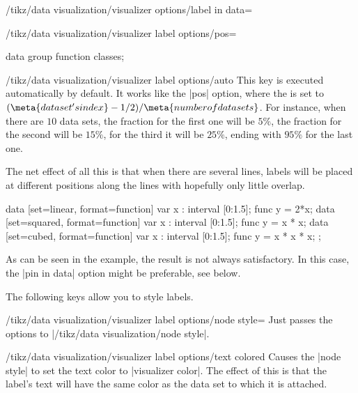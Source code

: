 \begin{key}{/tikz/data visualization/visualizer options/label in data=}
\begin{key}{/tikz/data visualization/visualizer label options/pos=}
\begin{codeexample}[width=6.3cm]
\tikz \datavisualization [
  school book axes,
  x axis={label=$x$},
  visualize as smooth line=exp,
  exp=    {label in data={text=$.2$, pos=0.2},
           label in data={text=$.5$, pos=0.5},
           label in data={text=$.95$, pos=0.95},
           style={mark=x}},
  style sheet=vary hue]
data group {function classes};
\end{codeexample}
    \end{key}
    \begin{key}{/tikz/data visualization/visualizer label options/auto}
        This key is executed automatically by default. It works like the |pos|
        option, where the  is set to $(\meta{data set's
        index}-1/2)/\meta{number of data sets}$. For instance, when there are
        $10$ data sets, the fraction for the first one will be $5\%$, the
        fraction for the second will be $15\%$, for the third it will be
        $25\%$, ending with $95\%$ for the last one.

        The net effect of all this is that when there are several lines, labels
        will be placed at different positions along the lines with hopefully
        only little overlap.
\begin{codeexample}[width=6.3cm]
\tikz \datavisualization [
  scientific axes=clean,
  visualize as smooth line/.list={linear, squared, cubed},
  linear ={label in data={text=$2x$}},
  squared={label in data={text=$x^2$}},
  cubed  ={label in data={text=$x^3$}}]
data [set=linear, format=function] {
  var x : interval [0:1.5];
  func y = 2*\value x;
}
data [set=squared, format=function] {
  var x : interval [0:1.5];
  func y = \value x * \value x;
}
data [set=cubed, format=function] {
  var x : interval [0:1.5];
  func y = \value x * \value x * \value x;
};
\end{codeexample}
        As can be seen in the example, the result is not always satisfactory.
        In this case, the |pin in data| option might be preferable, see below.
    \end{key}

    The following keys allow you to style labels.

    \begin{key}{/tikz/data visualization/visualizer label options/node style=}
        Just passes the options to |/tikz/data visualization/node style|.
    \end{key}
    \begin{key}{/tikz/data visualization/visualizer label options/text colored}
        Causes the |node style| to set the text color to |visualizer color|.
        The effect of this is that the label's text will have the same color as
        the data set to which it is attached.
    \end{key}


\end{key}
